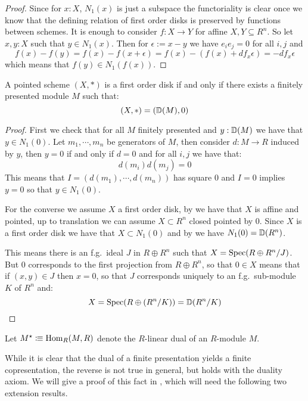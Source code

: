 \begin{proof}
  Since for $x:X$, $N_1(x)$ is just a subspace the functoriality is clear once we know that the defining relation of first order disks is preserved by functions between schemes.
  It is enough to consider $f:X\to Y$ for affine $X,Y\subseteq R^n$.
  So let $x,y:X$ such that $y\in N_1(x)$. Then for $\epsilon:=x-y$ we have $e_ie_j=0$ for all $i,j$ and
  \[ f(x)-f(y)=f(x)-f(x+\epsilon)=f(x)-(f(x) + df_x\epsilon)=-df_x\epsilon\]
  which means that $f(y)\in N_1(f(x))$.
\end{proof}

\begin{lemma}\label{disk-are-infinitesimal}
A pointed scheme $(X,*)$ is a first order disk if and only if there exists a finitely presented module $M$ such that:
\[(X,*) = (\mathbb{D}(M),0)\]
\end{lemma}

\begin{proof}
First we check that for all $M$ finitely presented and $y:\mathbb{D}(M)$ we have that $y\in N_1(0)$. Let $m_1,\cdots, m_n$ be generators of $M$, then consider $d:M\to R$ induced by $y$, then $y=0$ if and only if $d=0$ and for all $i,j$ we have that:
\[d(m_i)d(m_j) = 0\]
This means that $I = (d(m_1),\cdots,d(m_n))$ has square $0$ and $I=0$ implies $y=0$ so that $y\in N_1(0)$.

For the converse we assume $X$ a first order disk, by  we have that $X$ is affine and pointed, up to translation we can assume $X\subset R^n$ closed pointed by $0$. Since $X$ is a first order disk we have that $X\subset N_1(0)$ and by  we have $N_1(0) = \mathbb{D}(R^n)$.

This means there is an f.g.\ ideal $J$ in $R\oplus R^n$ such that $X=\operatorname{Spec}(R\oplus R^n / J)$.
But $0$ corresponds to the first projection from $R\oplus R^n$, so that $0\in X$ means that if $(x,y)\in J$ then $x=0$, so that $J$ corresponds uniquely to an f.g.\ sub-module $K$ of $R^n$ and:
\[X = \operatorname{Spec}(R\oplus (R^n/K)) = \mathbb{D}(R^n/K)\] 
\end{proof}

\begin{definition}
  Let $M^\star\vcentcolon\mspace{-1.2mu}\equiv \mathrm{Hom}_{R}(M,R)$ denote the $R$-linear dual of an $R$-module $M$.
\end{definition}

While it is clear that the dual of a finite presentation yields a finite copresentation, the reverse is not true in general, but holds with the duality axiom.
We will give a proof of this fact in , which will need the following two extension results.

